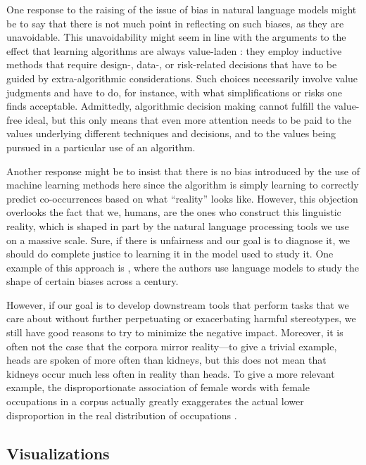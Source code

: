 \documentclass{clv3}
\begin{document}
\label{appendix:philosophical}


One response to the raising of the issue of bias in natural language
	models might be to say that there is not much point in reflecting on
	such biases, as they are unavoidable. This unavoidability might seem in
	line with the arguments to the effect that learning algorithms are
	always value-laden \citep{JohnsonValueFree}: they employ inductive methods that require
	design-, data-, or risk-related decisions that have to be guided by
	extra-algorithmic considerations. Such choices necessarily involve value
	judgments and have to do, for instance, with what simplifications or
	risks one finds acceptable. Admittedly, algorithmic decision making
	cannot fulfill the value-free ideal, but this only means that even more
	attention needs to be paid to the values underlying different techniques
	and decisions, and to the values being pursued in a particular use of an
	algorithm.
	
	Another response might be to insist that there is no bias introduced by
	the use of machine learning methods here since the algorithm is simply
	learning to correctly predict co-occurrences based on what ``reality''
	looks like. However, this objection overlooks the fact that we, humans,
	are the ones who construct this linguistic reality, which is shaped in
	part by the natural language processing tools we use on a massive scale.
	Sure, if there is unfairness and our goal is to diagnose it, we should
	do complete justice to learning it in the model used to study it. One
	example of this approach is \citep{Garg2017hundredYears}, where the authors use language
	models to study the shape of certain biases across a century.
	
	However, if our goal is to develop downstream tools that perform tasks
	that we care about without further perpetuating or exacerbating harmful
	stereotypes, we still have good reasons to try to minimize the negative
	impact. Moreover, it is often not the case that the corpora mirror
	reality---to give a trivial example, heads are spoken of more often than
	kidneys, but this does not mean that kidneys occur much less often in
	reality than heads. To give a more relevant example, the
	disproportionate association of female words with female occupations in
	a corpus actually greatly exaggerates the actual lower disproportion in
	the real distribution of occupations \citep{gordon2012reporting}.
	
	
\hypertarget{visualizations}{%
\subsection{Visualizations}\label{visualizations}}
\end{document}
